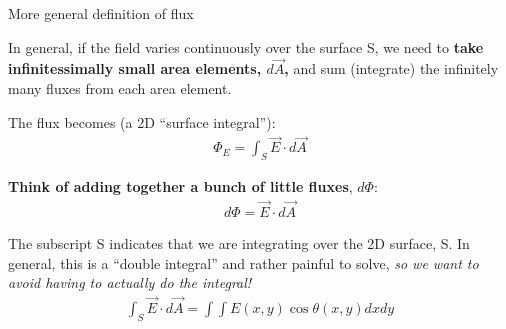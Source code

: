 \documentclass[aspectratio=169,
hyperref={colorlinks,urlcolor=blue}
]{beamer}
\begin{document}
{\begin{center}
\begin{tikzpicture}
\end{tikzpicture}
\end{center}
}

\begin{bulletframe}{More general definition of flux}
\item In general, if the field varies continuously over the surface S, we need to \textbf{take infinitessimally small area elements, $ d\vec A$,} and sum (integrate) the infinitely many fluxes from each area element.
\item The flux becomes (a 2D ``surface integral''):
\begin{align*}
\Phi_E=\int_S \vec E \cdot d\vec A
\end{align*}
\item \textbf{Think of adding together a bunch of little fluxes}, $d\Phi$:
\begin{align*}
d\Phi = \vec E \cdot d\vec A
\end{align*}
\item The subscript S indicates that we are integrating over the 2D surface, S. In general, this is a “double integral” and rather painful to solve, \textit{so we want to avoid having to actually do the integral!}
\begin{align*}
\int_S \vec E \cdot d\vec A = \int\int E(x,y)\cos\theta(x,y)dxdy
\end{align*}
\end{bulletframe}
\end{document}
